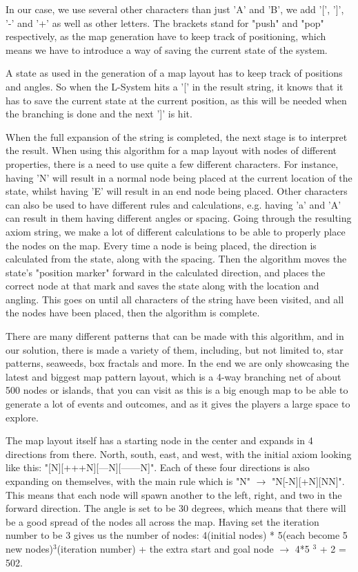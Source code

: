 In our case, we use several other characters than just 'A' and 'B', we add '[', ']', '-' and '+' as well as other letters. The brackets stand for "push" and "pop" respectively, as the map generation have to keep track of positioning, which means we have to introduce a way of saving the current state of the system.

A state as used in the generation of a map layout has to keep track of positions and angles. So when the L-System hits a '[' in the result string, it knows that it has to save the current state at the current position, as this will be needed when the branching is done and the next ']' is hit. 

When the full expansion of the string is completed, the next stage is to interpret the result. When using this algorithm for a map layout with nodes of different properties, there is a need to use quite a few different characters. For instance, having 'N' will result in a normal node being placed at the current location of the state, whilst having 'E' will result in an end node being placed. Other characters can also be used to have different rules and calculations, e.g. having 'a' and 'A' can result in them having different angles or spacing.
Going through the resulting axiom string, we make a lot of different calculations to be able to properly place the nodes on the map. Every time a node is being placed, the direction is calculated from the state, along with the spacing. Then the algorithm moves the state's "position marker" forward in the calculated direction, and places the correct node at that mark and saves the state along with the location and angling.
This goes on until all characters of the string have been visited, and all the nodes have been placed, then the algorithm is complete.

There are many different patterns that can be made with this algorithm, and in our solution, there is made a variety of them, including, but not limited to, star patterns, seaweeds, box fractals and more. 
In the end we are only showcasing the latest and biggest map pattern layout, which is a 4-way branching net of about 500 nodes or islands, that you can visit as this is a big enough map to be able to generate a lot of events and outcomes, and as it gives the players a large space to explore.

The map layout itself has a starting node in the center and expands in 4 directions from there. North, south, east, and west, with the initial axiom looking like this: "[N][+++N][---N][------N]". Each of these four directions is also expanding on themselves, with the main rule which is "N" $\rightarrow$ "N[-N][+N][NN]". This means that each node will spawn another to the left, right, and two in the forward direction. The angle is set to be 30 degrees, which means that there will be a good spread of the nodes all across the map. Having set the iteration number to be 3 gives us the number of nodes: 4(initial nodes) * 5(each become 5 new nodes)$^3$(iteration number) + the extra start and goal node $\rightarrow$ 4*5 $ ^3 $ + 2 = 502.


